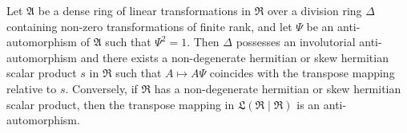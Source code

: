Let $\mathfrak{A}$ be a dense ring of linear transformations in $\mathfrak{R}$ over a division ring $\Delta$ containing non-zero transformations of finite rank, and let $\Psi$ be an anti-automorphism of $\mathfrak{A}$ such that $\Psi^2 = 1$. Then $\Delta$ possesses an involutorial anti-automorphism and there exists a non-degenerate hermitian or skew hermitian scalar product $s$ in $\mathfrak{R}$ such that $A \mapsto A\Psi$ coincides with the transpose mapping relative to $s$. Conversely, if $\mathfrak{R}$ has a non-degenerate hermitian or skew hermitian scalar product, then the transpose mapping in $\mathfrak{L}(\mathfrak{R} \mid \mathfrak{R})$ is an anti-automorphism.
